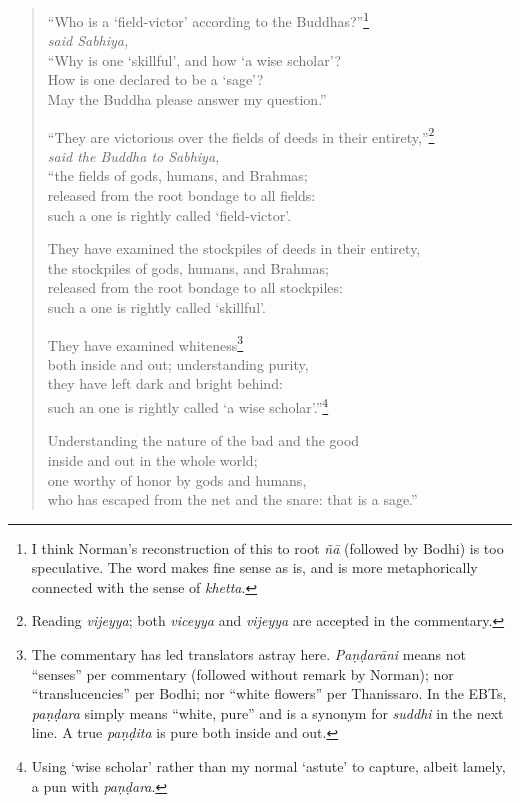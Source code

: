 \documentclass[12pt,openany]{book}%
\newcommand*{\scspeaker}[1]{\hspace{2em}\textit{#1}}
\begin{document}
\begin{verse}%
“Who is a ‘field-victor’ according to the Buddhas?”\footnote{I think Norman’s reconstruction of this to root \textit{\textsanskrit{ñā}} (followed by Bodhi) is too speculative. The word makes fine sense as is, and is more metaphorically connected with the sense of \textit{khetta}. } \\
\scspeaker{said Sabhiya, }\\
“Why is one ‘skillful’, and how ‘a wise scholar’? \\
How is one declared to be a ‘sage’? \\
May the Buddha please answer my question.” 

“They are victorious over the fields of deeds in their entirety,”\footnote{Reading \textit{vijeyya}; both \textit{viceyya} and \textit{vijeyya} are accepted in the commentary. } \\
\scspeaker{said the Buddha to Sabhiya, }\\
“the fields of gods, humans, and Brahmas; \\
released from the root bondage to all fields: \\
such a one is rightly called ‘field-victor’. 

They have examined the stockpiles of deeds in their entirety, \\
the stockpiles of gods, humans, and Brahmas; \\
released from the root bondage to all stockpiles: \\
such a one is rightly called ‘skillful’. 

They have examined whiteness\footnote{The commentary has led translators astray here. \textit{\textsanskrit{Paṇḍarāni}} means not “senses” per commentary (followed without remark by Norman); nor “translucencies” per Bodhi; nor “white flowers” per Thanissaro. In the EBTs, \textit{\textsanskrit{paṇḍara}} simply means “white, pure” and is a synonym for \textit{suddhi} in the next line. A true \textit{\textsanskrit{paṇḍita}} is pure both inside and out. } \\
both inside and out; understanding purity, \\
they have left dark and bright behind: \\
such an one is rightly called ‘a wise scholar’.”\footnote{Using ‘wise scholar’ rather than my normal ‘astute’ to capture, albeit lamely, a pun with \textit{\textsanskrit{paṇḍara}}. } 

Understanding the nature of the bad and the good \\
inside and out in the whole world; \\
one worthy of honor by gods and humans, \\
who has escaped from the net and the snare: that is a sage.” 

%
\end{verse}
\end{document}
